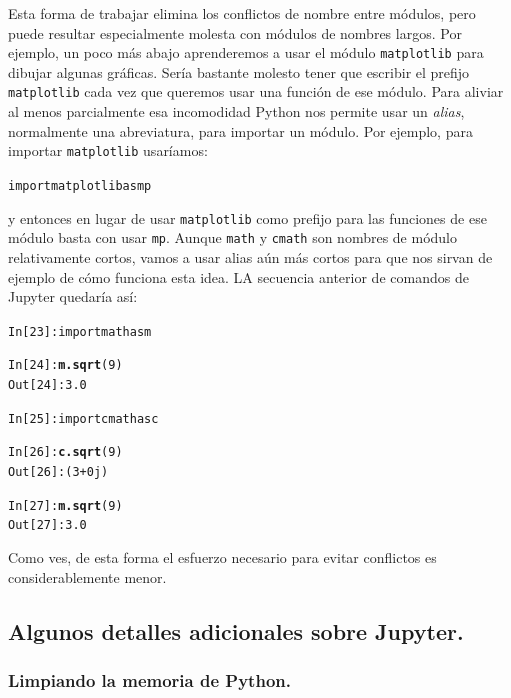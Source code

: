 \documentclass[10pt,a4paper]{article}\usepackage[]{graphicx}\usepackage[]{color}
\makeatletter
\newcommand{\hlkwd}[1]{\textcolor[rgb]{0.737,0.353,0.396}{\textbf{#1}}}%
\newenvironment{kframe}{%
 \def\at@end@of@kframe{}%
 \ifinner\ifhmode%
  \def\at@end@of@kframe{\end{minipage}}%
  \begin{minipage}{\columnwidth}%
 \fi\fi%
 \def\FrameCommand##1{\hskip\@totalleftmargin \hskip-\fboxsep
 \colorbox{shadecolor}{##1}\hskip-\fboxsep
     \hskip-\linewidth \hskip-\@totalleftmargin \hskip\columnwidth}%
 \MakeFramed {\advance\hsize-\width
   \@totalleftmargin\z@ \linewidth\hsize
   \@setminipage}}%
 {\par\unskip\endMakeFramed%
 \at@end@of@kframe}
\newenvironment{knitrout}{}{} %
\makeatother
\begin{document}
Esta forma de trabajar elimina los conflictos de nombre entre módulos, pero puede resultar especialmente molesta con módulos de nombres largos. Por ejemplo, un poco más abajo aprenderemos a usar el módulo {\tt matplotlib} para dibujar algunas gráficas. Sería bastante molesto tener que escribir el prefijo {\tt matplotlib} cada vez que queremos usar una función de ese módulo. Para aliviar al menos parcialmente esa incomodidad Python nos permite usar un {\em alias}, normalmente una abreviatura, para importar un módulo. Por ejemplo, para importar {\tt matplotlib} usaríamos:
\begin{knitrout}
\color{fgcolor}\begin{kframe}
\begin{alltt}
import matplotlib as mp
\end{alltt}
\end{kframe}
\end{knitrout}
y entonces en lugar de usar {\tt matplotlib} como prefijo para las funciones de ese módulo basta con usar {\tt mp}. Aunque {\tt math} y {\tt cmath} son nombres de módulo relativamente cortos, vamos a usar alias aún más cortos para que nos sirvan de ejemplo de cómo funciona esta idea. LA secuencia anterior de comandos de Jupyter quedaría así:
\begin{knitrout}
\color{fgcolor}\begin{kframe}
\begin{alltt}
In [23]: import math as m

In [24]: \hlkwd{m.sqrt}(9)
Out[24]: 3.0

In [25]: import cmath as c

In [26]: \hlkwd{c.sqrt}(9)
Out[26]: (3+0j)

In [27]: \hlkwd{m.sqrt}(9)
Out[27]: 3.0
\end{alltt}
\end{kframe}
\end{knitrout}
Como ves, de esta forma el esfuerzo necesario para evitar conflictos es considerablemente menor.

\subsection{Algunos detalles adicionales sobre Jupyter.}
\label{tut02:subsec:AlgunosDetallesAdicionalesJupyter}

\subsubsection*{Limpiando la memoria de Python.}
\label{tut02:subsubsec:limpiandoMemoriaPython}
\end{document}
